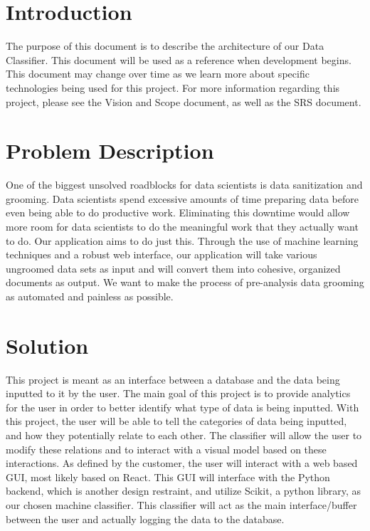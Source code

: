\documentclass[12pt,oneside,letterpaper]{article}
\begin{document}
\newpage

\section{Introduction}

The purpose of this document is to describe the architecture of our Data Classifier. This document will be used as a reference when development begins. This document may change over time as we learn more about specific technologies being used for this project. For more information regarding this project, please see the Vision and Scope document, as well as the SRS document.

\section{Problem Description}
One of the biggest unsolved roadblocks for data scientists is data sanitization and grooming. Data scientists spend excessive amounts of time preparing data before even being able to do productive work. Eliminating this downtime would allow more room for data scientists to do the meaningful work that they actually want to do. Our application aims to do just this. Through the use of machine learning techniques and a robust web interface, our application will take various ungroomed data sets as input and will convert them into cohesive, organized documents as output. We want to make the process of pre-analysis data grooming as automated and painless as possible. 



\section{Solution}
This project is meant as an interface between a database and the data being inputted to it by the user. The main goal of this project is to provide analytics for the user in order to better identify what type of data is being inputted. With this project, the user will be able to tell the categories of data being inputted, and how they potentially relate to each other. The classifier will allow the user to modify these relations and to interact with a visual model based on these interactions. As defined by the customer, the user will interact with a web based GUI, most likely based on React. This GUI will interface with the Python backend, which is another design restraint, and utilize Scikit, a python library, as our chosen machine classifier. This classifier will act as the main interface/buffer between the user and actually logging the data to the database. 
\end{document}
